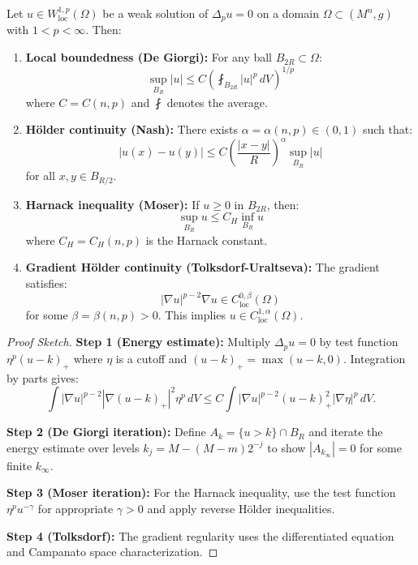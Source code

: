 \begin{theorem}\label{thm:DGNM}
Let $u \in W^{1,p}_{\mathrm{loc}}(\Omega)$ be a weak solution of $\Delta_p u = 0$ on a domain $\Omega \subset (M^n, g)$ with $1 < p < \infty$. Then:
\begin{enumerate}
\item \textbf{Local boundedness (De Giorgi):} For any ball $B_{2R} \subset \Omega$:
\begin{equation}
\sup_{B_R} |u| \leq C \left( \fint_{B_{2R}} |u|^p \, dV \right)^{1/p}
\end{equation}
where $C = C(n, p)$ and $\fint$ denotes the average.

\item \textbf{H\"older continuity (Nash):} There exists $\alpha = \alpha(n, p) \in (0, 1)$ such that:
\begin{equation}
|u(x) - u(y)| \leq C \left( \frac{|x-y|}{R} \right)^\alpha \sup_{B_R} |u|
\end{equation}
for all $x, y \in B_{R/2}$.

\item \textbf{Harnack inequality (Moser):} If $u \geq 0$ in $B_{2R}$, then:
\begin{equation}
\sup_{B_R} u \leq C_H \inf_{B_R} u
\end{equation}
where $C_H = C_H(n, p)$ is the Harnack constant.

\item \textbf{Gradient H\"older continuity (Tolksdorf-Uraltseva):} The gradient satisfies:
\begin{equation}
|\nabla u|^{p-2} \nabla u \in C^{0,\beta}_{\mathrm{loc}}(\Omega)
\end{equation}
for some $\beta = \beta(n, p) > 0$. This implies $u \in C^{1,\alpha}_{\mathrm{loc}}(\Omega)$.
\end{enumerate}
\end{theorem}

\begin{proof}[Proof Sketch]
\textbf{Step 1 (Energy estimate):} Multiply $\Delta_p u = 0$ by test function $\eta^p(u - k)_+$ where $\eta$ is a cutoff and $(u-k)_+ = \max(u-k, 0)$. Integration by parts gives:
\begin{equation}
\int |\nabla u|^{p-2} |\nabla(u-k)_+|^2 \eta^p \, dV \leq C \int |\nabla u|^{p-2} (u-k)_+^2 |\nabla \eta|^p \, dV.
\end{equation}

\textbf{Step 2 (De Giorgi iteration):} Define $A_k = \{u > k\} \cap B_R$ and iterate the energy estimate over levels $k_j = M - (M-m)2^{-j}$ to show $|A_{k_\infty}| = 0$ for some finite $k_\infty$.

\textbf{Step 3 (Moser iteration):} For the Harnack inequality, use the test function $\eta^p u^{-\gamma}$ for appropriate $\gamma > 0$ and apply reverse H\"older inequalities.

\textbf{Step 4 (Tolksdorf):} The gradient regularity uses the differentiated equation and Campanato space characterization.
\end{proof}

